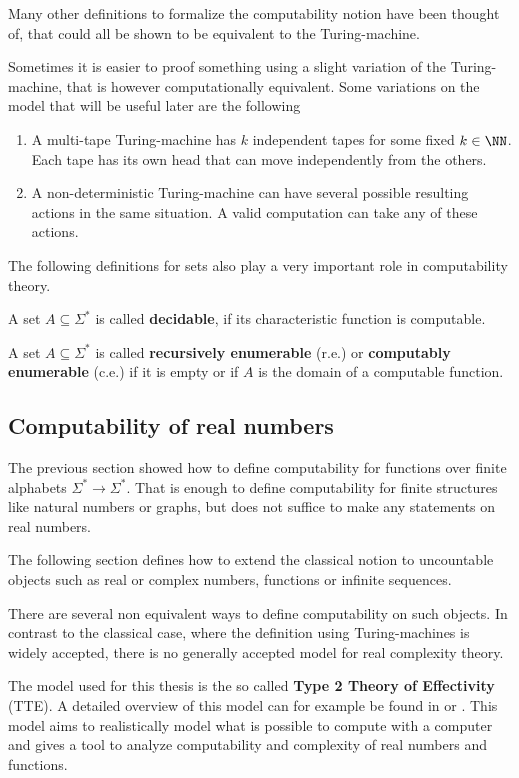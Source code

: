  Many other definitions to formalize the computability notion have been thought
 of, that could all be shown to be equivalent to the Turing-machine.

 Sometimes it is easier to proof something using a slight variation of the
 Turing-machine, that is however computationally equivalent.
 Some variations on the model that will be useful later are the following
 \begin{enumerate}
   \item A multi-tape Turing-machine has $k$ independent tapes for some fixed $k \in
     \NN$. Each tape has its own head that can move independently from the
     others.
   \item A non-deterministic Turing-machine can have several possible resulting
     actions in the same situation. A valid computation can take any of these
     actions. 
 \end{enumerate}

 The following definitions for sets also play a very important role in
 computability theory.
  \begin{definition}
A set $A \subseteq \Sigma^*$ is called \textbf{decidable}, if its characteristic function is computable.
\end{definition}
\begin{definition}
A set $A \subseteq \Sigma^*$ is called \textbf{recursively enumerable} (r.e.) or \textbf{computably enumerable} (c.e.) if
it is empty or if $A$ is the domain of a computable function.
\end{definition}
\subsection{Computability of real numbers}
The previous section showed how to define computability for functions over finite alphabets $\Sigma^* \to \Sigma^*$. 
That is enough to define computability for finite structures like natural
numbers or graphs, but does not suffice to make any statements on real numbers.

The following section defines how to extend the classical notion to uncountable
objects such as real or complex numbers, functions or infinite sequences.

There are several non equivalent ways to define computability on such objects. 
In contrast to the classical case, where the definition using Turing-machines is widely accepted, there is no 
generally accepted model for real complexity theory.

The model used for this thesis is the so called \textbf{Type 2 Theory of Effectivity}
(TTE). 
A detailed overview of this model can for example be found in \cite{Wei} or
\cite{Brattka2008a}.
This model aims to realistically model what is possible to compute with a
computer and gives a tool to analyze computability and complexity of real
numbers and functions.

